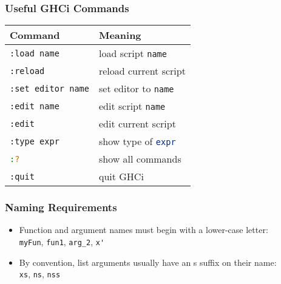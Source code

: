 \begin{multicols}{2}
\subsubsection{Useful GHCi Commands}
\begin{tabularx}{\linewidth}{|X|X|}
  \hline
  \textbf{Command} & \textbf{Meaning} \\
  \hline
  \lstinline[language=bash]|:load name| & load script \lstinline[language=bash]|name| \\
  \lstinline[language=bash]|:reload| & reload current script \\
  \lstinline[language=bash]|:set editor name| & set editor to \lstinline[language=bash]|name| \\
  \lstinline[language=bash]|:edit name| & edit script \lstinline[language=bash]|name| \\
  \lstinline[language=bash]|:edit| & edit current script \\
  \lstinline[language=bash]|:type expr| & show type of \lstinline[language=bash]|expr| \\
  \lstinline[language=bash]|:?| & show all commands \\
  \lstinline[language=bash]|:quit| & quit GHCi \\
  \hline
\end{tabularx}

\subsubsection{Naming Requirements}
\begin{itemize}
  \item Function and argument names must begin with a lower-case letter:\\
  \lstinline{myFun}, \lstinline{fun1}, \lstinline{arg_2}, \lstinline{x'}
  \item By convention, list arguments usually have an s suffix on their name:\\
  \lstinline{xs}, \lstinline{ns}, \lstinline{nss}
\end{itemize}

\end{multicols}

